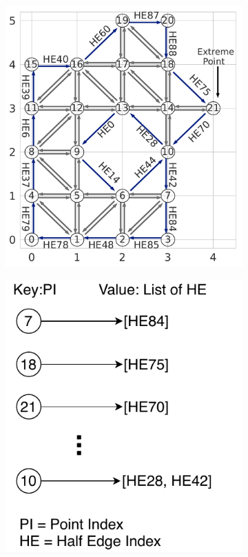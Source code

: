 \begin{figure}[ht]
    \centering
  \begin{subfigure}[t]{.30\linewidth}
    \centering
    \includegraphics[width=0.99\linewidth]{chapter_2_polylidar/imgs/algorithm1_visual.pdf}
    \caption{}
    \label{fig:ch2_algorithm1_visual_boundary}
  \end{subfigure}
  \begin{subfigure}[t]{.25\linewidth}
    \centering
    \includegraphics[clip, trim=0cm 0cm 0.5cm 0cm,width=.99\linewidth]{chapter_2_polylidar/imgs/HashMap_PS.pdf}

\end{subfigure}
\end{figure}
